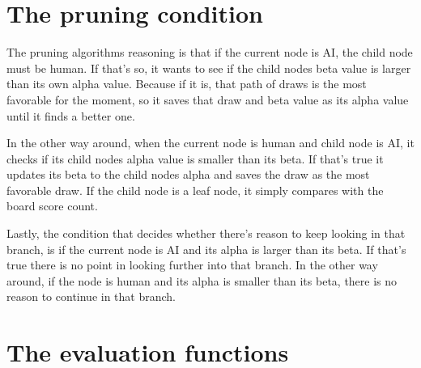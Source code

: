 \documentclass{article}
\begin{document}
\section{The pruning condition}
The pruning algorithms reasoning is that if the current node is AI, the child node
must be human. If that's so, it wants to see if the child nodes beta value is larger
than its own alpha value. Because if it is, that path of draws is the most favorable
for the moment, so it saves that draw and beta value as its alpha value until it finds a better one.

In the other way around, when the current node is human and child node is AI, it
checks if its child nodes alpha value is smaller than its beta.
If that's true it updates its beta to the child nodes alpha and saves the draw
as the most favorable draw. If the child node is a leaf node, it simply compares with the board score count.

Lastly, the condition that decides whether there's reason to keep looking in that branch,
is if the current node is AI and its alpha is larger than its beta. If that's true there is
no point in looking further into that branch.
In the other way around, if the node is human and its alpha is smaller than its beta, there is
no reason to continue in that branch.

\section{The evaluation functions}
\end{document}
